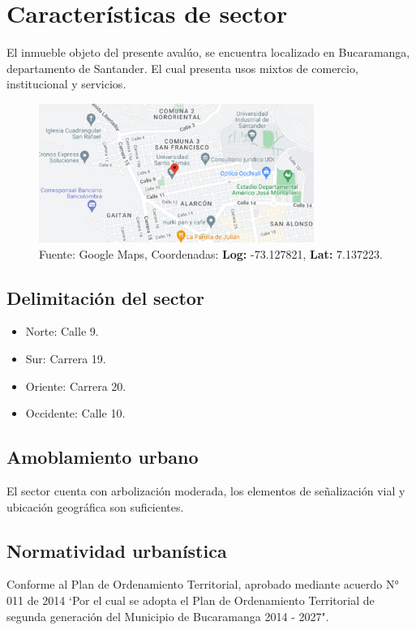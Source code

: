\documentclass[12pt,a4paper,twoside]{article}
\begin{document}
{\section{Características de sector}
El inmueble objeto del presente avalúo, se encuentra localizado en Bucaramanga, departamento de Santander. El cual presenta usos mixtos de comercio, institucional y servicios.

\begin{figure}[h]
	\centering
	\includegraphics[width=0.8\textwidth]{Imagenes/ubicacion1}
	\caption{Fuente: Google Maps, Coordenadas: \textbf{Log:} -73.127821, \textbf{Lat:} 	
		7.137223.}
	\label{fig:mesh1}
\end{figure}

\subsection{Delimitación del sector}

\begin{itemize}
	\item Norte: Calle 9.
	\item Sur: Carrera 19.
	\item Oriente: Carrera 20.
	\item Occidente: Calle 10.
\end{itemize} 

\subsection{Amoblamiento urbano}

El sector cuenta con arbolización moderada, los elementos de señalización vial y ubicación geográfica son suficientes.

\subsection{Normatividad urbanística}

Conforme al Plan de Ordenamiento Territorial, aprobado mediante acuerdo N° 011 de 2014  `Por el cual se adopta el Plan de Ordenamiento Territorial de segunda generación del Municipio de Bucaramanga 2014 - 2027".

}
\end{document}
